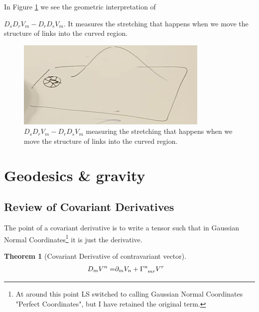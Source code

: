 \documentclass[]{article}
\newtheorem{thm}{Theorem}
\begin{document}
In Figure \ref{fig:gr-3-move-links} we see the geometric interpretation of {$D_s D_r V_m - D_r D_s V_m$. It measures the stretching that happens when we move the structure of links into the curved region.

\begin{figure}[H]
	\caption[Geometric meaning of $D_s D_r V_m - D_r D_s V_m$]{$D_s D_r V_m - D_r D_s V_m$ measuring the stretching that happens when we move the structure of links into the curved region.}\label{fig:gr-3-move-links}
	\includegraphics{gr-3-move-links}
\end{figure}


\section{Geodesics \& gravity}

\subsection{Review of Covariant Derivatives}

The point of a covariant derivative is to write a tensor such that in Gaussian Normal Coordinates\footnote{At around this point LS switched to calling Gaussian Normal Coordinates "Perfect Coordinates", but I have retained the original term.} it is just the derivative.

\begin{thm}[Covariant Derivative of contravariant vector]
	\begin{align*}
		D_m V^n =& \partial_m V_n + \Gamma\indices{^n_{mr}} V^r
	\end{align*}
\end{thm}

}
\end{document}
